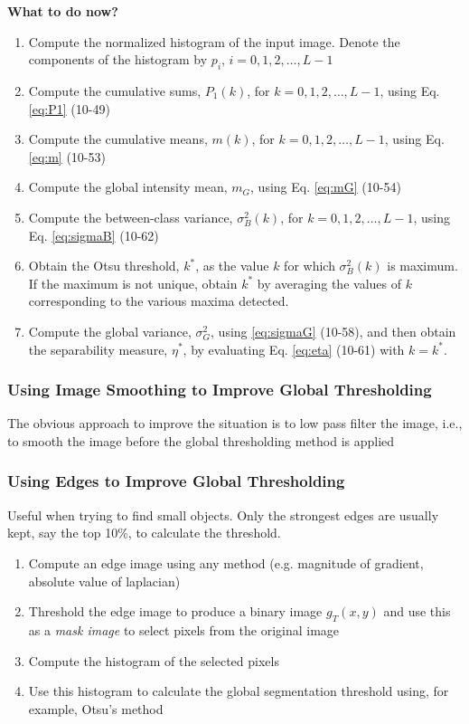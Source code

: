 \textbf{What to do now?}
\begin{enumerate}
	\item Compute the normalized histogram of the input image.
		Denote the components of the histogram by $p_i$, $i = 0, 1, 2, \ldots, L-1$
	\item Compute the cumulative sums, $P_1(k)$, for $k = 0, 1, 2, \ldots, L-1$, using Eq. \eqref{eq:P1} (10-49)
	\item Compute the cumulative means, $m(k)$, for $k = 0, 1, 2, \ldots, L-1$, using Eq. \eqref{eq:m} (10-53)
	\item Compute the global intensity mean, $m_G$, using Eq. \eqref{eq:mG} (10-54)
	\item Compute the between-class variance, $\sigma_B^2(k)$, for $k = 0, 1, 2, \ldots, L-1$, using Eq. \eqref{eq:sigmaB} (10-62)
	\item Obtain the Otsu threshold, $k^\ast$, as the value $k$ for which $\sigma_B^2(k)$ is maximum.
		If the maximum is not unique, obtain $k^\ast$ by averaging the values of $k$ corresponding to the various maxima detected.
  \item Compute the global variance, $\sigma_G^2$, using \eqref{eq:sigmaG} (10-58), and then obtain the separability measure, $\eta^\ast$, by evaluating Eq. \eqref{eq:eta} (10-61) with $k = k^\ast$.
\end{enumerate}

\subsubsection{Using Image Smoothing to Improve Global Thresholding}
The obvious approach to improve the situation is to low pass filter the image, i.e., to smooth the image before the global thresholding method is applied
\subsubsection{Using Edges to Improve Global Thresholding}
Useful when trying to find small objects.
Only the strongest edges are usually kept, say the top 10\%, to calculate the threshold.
\begin{enumerate}
	\item Compute an edge image using any method (e.g. magnitude of gradient, absolute value of laplacian)
	\item Threshold the edge image to produce a binary image $g_T(x,y)$ and use this as a \emph{mask image} to select pixels from the original image
	\item Compute the histogram of the selected pixels
	\item Use this histogram to calculate the global segmentation threshold
		using, for example, Otsu's method
\end{enumerate}

